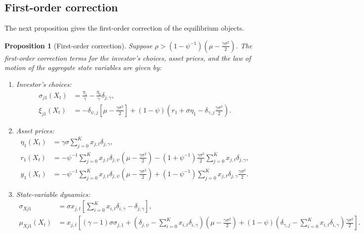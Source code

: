 \documentclass[11pt,english]{article}
\newtheorem{prop}{Proposition}
\begin{document}
\subsection{First-order correction} 

The next proposition gives the first-order correction of the equilibrium objects.
\begin{prop}[First-order correction]
Suppose $\rho > (1-\psi^{-1}) \left(\mu - \frac{\gamma \sigma^2}{2}\right) $. The first-order correction terms for the investor's choices, asset prices, and the law of motion of the aggregate state variables are given by:

\begin{enumerate}
    \item Investor's choices:
\begin{align}
    \sigma_{j1}(X_t) &= \frac{\eta_1}{\gamma} - \frac{\eta_0}{\gamma} \delta_{j,\gamma},\\
    \xi_{j1}(X_t) &= -\delta_{\psi,j} \left[\mu - \frac{\gamma\sigma^2}{2} \right]+(1-\psi) \left(r_1 + \sigma \eta_1 - \delta_{\gamma,j}\frac{\gamma \sigma^2}{2}\right).
\end{align}
\item Asset prices:
\begin{align}
    \eta_1(X_t) &= \gamma \sigma \sum_{j=0}^K x_{j,t} \delta_{j,\gamma},\\
    r_1(X_t) &=  -\psi^{-1} \sum_{j=0}^K x_{j,t} \delta_{j,\psi}  \left(\mu -\frac{\gamma \sigma^2}{2}\right)   - (1+\psi^{-1}) \frac{\gamma \sigma^2}{2} \sum_{j=0}^K x_{j,t} \delta_{j,\gamma},\\
    y_1(X_t) &=  - \psi^{-1}\sum_{j=0}^K x_{j,t} \delta_{j,\psi} \left( \mu - \frac{\gamma \sigma^2}{2} \right) + (1- \psi^{-1})  \sum_{j=0}^K x_{j,t} \delta_{j,\gamma} \frac{\gamma \sigma^2}{2}.
\end{align}

\item State-variable dynamics:\small
\begin{align}
\sigma_{Xj1} &= \sigma x_{j,t} \left[ \sum_{i=0}^K x_{i,t} \delta_{i,\gamma} - \delta_{j,\gamma} \right],\\
    \mu_{Xj1}(X_t) &= x_{j,t} \left[  (\gamma  -1) \sigma \sigma_{j,1} +\left(\delta_{j,\psi} -\sum_{i=0}^K x_{i,t} \delta_{i,\gamma}\right)\left(\mu - \frac{\gamma\sigma^2}{2}\right) +(1-\psi) \left(\delta_{\gamma,j} - \sum_{i=0}^K x_{i,t} \delta_{i,\gamma} \right) \frac{\gamma\sigma^2}{2} \right].
\end{align}\normalsize
\end{enumerate}



\end{prop}
\end{document}
